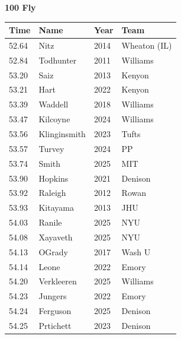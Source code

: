 \noindent\begin{minipage}[t]{0.98\textwidth}
\centering
\textbf{\textcolor{teamprimary}{100 Fly}}\par
\vspace{0.5em}
\centering
\small
\renewcommand{\arraystretch}{1.0}
\setlength{\tabcolsep}{4pt}
\begin{tabular}{@{}p{2.5cm}p{4.5cm}p{1.5cm}p{2.5cm}@{}}
\toprule
\textbf{Time} & \textbf{Name} & \textbf{Year} & \textbf{Team} \\
\midrule
52.64 & Nitz & 2014 & Wheaton (IL) \\
52.84 & Todhunter & 2011 & Williams \\
53.20 & Saiz & 2013 & Kenyon \\
53.21 & Hart & 2022 & Kenyon \\
53.39 & Waddell & 2018 & Williams \\
53.47 & Kilcoyne & 2024 & Williams \\
53.56 & Klinginsmith & 2023 & Tufts \\
53.57 & Turvey & 2024 & PP \\
53.74 & Smith & 2025 & MIT \\
53.90 & Hopkins & 2021 & Denison \\
53.92 & Raleigh & 2012 & Rowan \\
53.93 & Kitayama & 2013 & JHU \\
54.03 & Ranile & 2025 & NYU \\
54.08 & Xayaveth & 2025 & NYU \\
54.13 & OGrady & 2017 & Wash U \\
54.14 & Leone & 2022 & Emory \\
54.20 & Verkleeren & 2025 & Williams \\
54.23 & Jungers & 2022 & Emory \\
54.24 & Ferguson & 2025 & Denison \\
54.25 & Prtichett & 2023 & Denison \\
\bottomrule
\end{tabular}
\end{minipage}
\vspace{1.2em}
